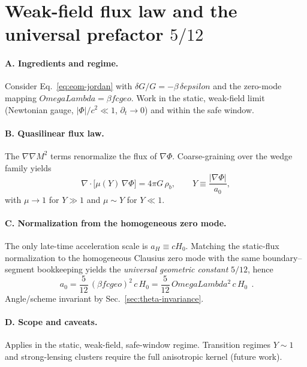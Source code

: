 \documentclass[aps,prd,onecolumn,superscriptaddress,nofootinbib]{revtex4-2}
\def\OmL{OmegaLambda}%
\def\cgeo{cgeo}%
\def\eps{epsilon}%
\def\boxed#1{#1}%
\newcommand{\OmL}{\Omega_\Lambda}
\newcommand{\cgeo}{c_{\rm geo}}
\newcommand{\eps}{\varepsilon}
\begin{document}
\section{Weak-field flux law and the universal prefactor \texorpdfstring{$5/12$}{5/12}}
\label{app:a0-derivation}
\paragraph*{A. Ingredients and regime.}
Consider Eq.~\eqref{eq:eom-jordan} with $\delta G/G=-\beta\,\delta\eps$ and the zero-mode mapping $\OmL=\beta f \cgeo$.
Work in the static, weak-field limit (Newtonian gauge, $|\Phi|/c^2\ll1$, $\partial_t\to 0$) and within the safe window.

\paragraph*{B. Quasilinear flux law.}
The $\nabla\nabla M^2$ terms renormalize the flux of $\nabla\Phi$. Coarse-graining over the wedge family yields
\begin{equation}
\nabla\!\cdot\!\big[\mu(Y)\,\nabla\Phi\big] = 4\pi G\,\rho_b, \qquad
Y \equiv \frac{|\nabla\Phi|}{a_0},
\end{equation}
with $\mu\to 1$ for $Y\gg 1$ and $\mu\sim Y$ for $Y\ll 1$.

\paragraph*{C. Normalization from the homogeneous zero mode.}
The only late-time acceleration scale is $a_H\equiv cH_0$. Matching the static-flux normalization to the homogeneous Clausius zero mode with the same boundary--segment bookkeeping yields the \emph{universal geometric constant} $5/12$, hence
\begin{equation}
\boxed{\ a_0 = \frac{5}{12}\,(\beta f \cgeo)^2\,c\,H_0 = \frac{5}{12}\,\OmL^2\,c\,H_0\ }\ .
\end{equation}
Angle/scheme invariant by Sec.~\ref{sec:theta-invariance}.

\paragraph*{D. Scope and caveats.}
Applies in the static, weak-field, safe-window regime. Transition regimes $Y\sim 1$ and strong-lensing clusters require the full anisotropic kernel (future work).
\end{document}
